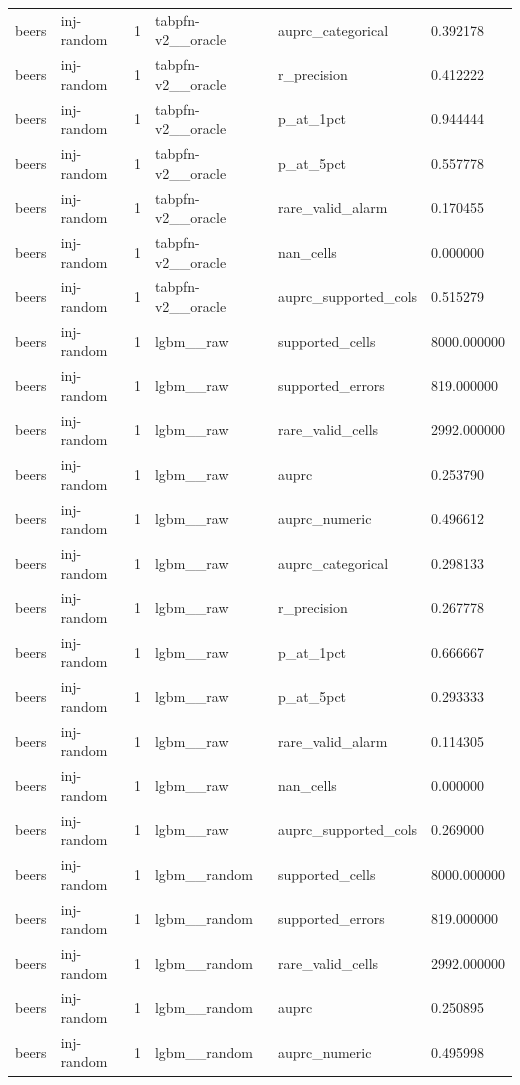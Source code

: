 \begin{tabular}{llllll}
beers & inj-random & 1 & tabpfn-v2\_\_oracle & auprc\_categorical & 0.392178 \\
beers & inj-random & 1 & tabpfn-v2\_\_oracle & r\_precision & 0.412222 \\
beers & inj-random & 1 & tabpfn-v2\_\_oracle & p\_at\_1pct & 0.944444 \\
beers & inj-random & 1 & tabpfn-v2\_\_oracle & p\_at\_5pct & 0.557778 \\
beers & inj-random & 1 & tabpfn-v2\_\_oracle & rare\_valid\_alarm & 0.170455 \\
beers & inj-random & 1 & tabpfn-v2\_\_oracle & nan\_cells & 0.000000 \\
beers & inj-random & 1 & tabpfn-v2\_\_oracle & auprc\_supported\_cols & 0.515279 \\
beers & inj-random & 1 & lgbm\_\_raw & supported\_cells & 8000.000000 \\
beers & inj-random & 1 & lgbm\_\_raw & supported\_errors & 819.000000 \\
beers & inj-random & 1 & lgbm\_\_raw & rare\_valid\_cells & 2992.000000 \\
beers & inj-random & 1 & lgbm\_\_raw & auprc & 0.253790 \\
beers & inj-random & 1 & lgbm\_\_raw & auprc\_numeric & 0.496612 \\
beers & inj-random & 1 & lgbm\_\_raw & auprc\_categorical & 0.298133 \\
beers & inj-random & 1 & lgbm\_\_raw & r\_precision & 0.267778 \\
beers & inj-random & 1 & lgbm\_\_raw & p\_at\_1pct & 0.666667 \\
beers & inj-random & 1 & lgbm\_\_raw & p\_at\_5pct & 0.293333 \\
beers & inj-random & 1 & lgbm\_\_raw & rare\_valid\_alarm & 0.114305 \\
beers & inj-random & 1 & lgbm\_\_raw & nan\_cells & 0.000000 \\
beers & inj-random & 1 & lgbm\_\_raw & auprc\_supported\_cols & 0.269000 \\
beers & inj-random & 1 & lgbm\_\_random & supported\_cells & 8000.000000 \\
beers & inj-random & 1 & lgbm\_\_random & supported\_errors & 819.000000 \\
beers & inj-random & 1 & lgbm\_\_random & rare\_valid\_cells & 2992.000000 \\
beers & inj-random & 1 & lgbm\_\_random & auprc & 0.250895 \\
beers & inj-random & 1 & lgbm\_\_random & auprc\_numeric & 0.495998 \\

\end{tabular}
